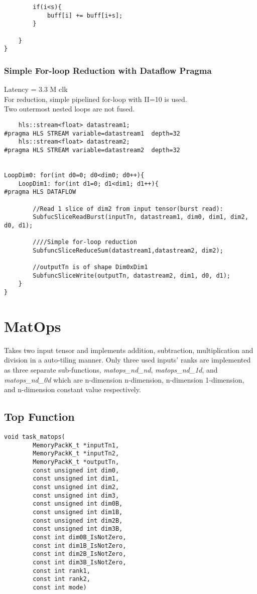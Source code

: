 \begin{enumerate}
\begin{lstlisting}
		if(i<s){
			buff[i] += buff[i+s];
		}

	}
}
\end{lstlisting}

\subsubsection{Simple For-loop Reduction with Dataflow Pragma}
Latency = 3.3 M clk \\
For reduction, simple pipelined for-loop with II=10 is used.\\
Two outermost nested loops are not fused.
\begin{lstlisting}
    hls::stream<float> datastream1;
#pragma HLS STREAM variable=datastream1  depth=32
    hls::stream<float> datastream2;
#pragma HLS STREAM variable=datastream2  depth=32


LoopDim0: for(int d0=0; d0<dim0; d0++){
	LoopDim1: for(int d1=0; d1<dim1; d1++){
#pragma HLS DATAFLOW

		//Read 1 slice of dim2 from input tensor(burst read):
		SubfucSliceReadBurst(inputTn, datastream1, dim0, dim1, dim2, d0, d1);

		////Simple for-loop reduction
		SubfuncSliceReduceSum(datastream1,datastream2, dim2);

		//outputTn is of shape Dim0xDim1
		SubfuncSliceWrite(outputTn, datastream2, dim1, d0, d1);
	}
}

\end{lstlisting}

\end{enumerate}






\pagebreak






\section{MatOps}
Takes two input tensor and implements addition, subtraction, multiplication and division in a auto-tiling manner. Only three used inputs' ranks are implemented as three separate sub-functions, \emph{matops\_nd\_nd}, \emph{matops\_nd\_1d}, and \emph{matops\_nd\_0d} which are n-dimension n-dimension, n-dimension 1-dimension, and n-dimension constant value respectively.
\subsection{Top Function}
\begin{lstlisting}
void task_matops(
		MemoryPackK_t *inputTn1,
		MemoryPackK_t *inputTn2,
		MemoryPackK_t *outputTn,
		const unsigned int dim0,
		const unsigned int dim1,
		const unsigned int dim2,
		const unsigned int dim3,
		const unsigned int dim0B,
		const unsigned int dim1B,
		const unsigned int dim2B,
		const unsigned int dim3B,
		const int dim0B_IsNotZero,
		const int dim1B_IsNotZero,
		const int dim2B_IsNotZero,
		const int dim3B_IsNotZero,
		const int rank1,
		const int rank2,
		const int mode)
\end{lstlisting}

